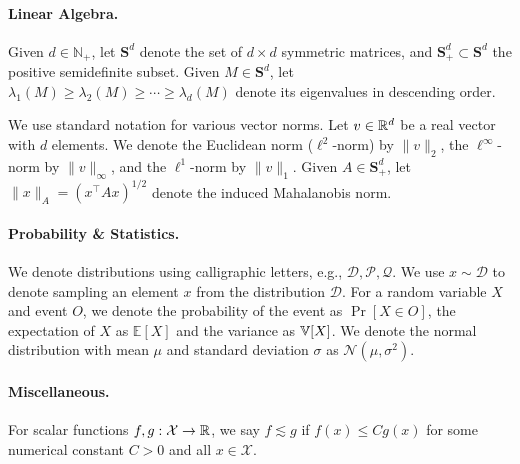 \paragraph{Linear Algebra.}
Given $d \in \mathbb{N}_+$, 
let $\mathbf{S}^d$ denote the set of $d \times d$ symmetric matrices, and $\mathbf{S}^d_+ \subset \mathbf{S}^d$ the positive semidefinite subset. 
Given $M \in \mathbf{S}^d$, let $\lambda_1(M) \ge \lambda_2(M) \ge \cdots \ge \lambda_d(M)$ denote its eigenvalues in descending order.

We use standard notation for various vector norms.
Let $v\in \mathbb{R}^d$ be a real vector with $d$ elements. 
We denote the Euclidean norm ($\ell^2$-norm) by $\|v\|_2$, 
the $\ell^\infty$-norm by $\|v\|_\infty$, and the $\ell^1$-norm by $\|v\|_1$.
Given $A \in \mathbf{S}^d_+$, let $\| x \|_A = (x^\top A x)^{1/2}$ denote the induced Mahalanobis norm.

\paragraph{Probability \& Statistics.}
We denote distributions using calligraphic letters, e.g., $\mathcal{D}, \mathcal{P}, \mathcal{Q}$. We use $x \sim \mathcal{D}$ to denote sampling an element $x$ from the distribution $\mathcal{D}$. For a random variable $X$ and event $O$, we denote the probability of the event as $\operatorname{Pr}[X\in O]$, the expectation of $X$ as $\mathbb{E}[X]$ and the variance as $\mathbb{V}[X]$. We denote the normal distribution with mean $\mu$ and standard deviation $\sigma$ as $\mathcal{N}\left(\mu, \sigma^2\right)$.

\paragraph{Miscellaneous.}
For scalar functions $f,g: \mathcal{X} \to \mathbb{R}$, we say $f \lesssim g$ if $f(x) \leq C g(x)$ for some numerical constant $C>0$ and all $x\in\mathcal{X}$. 
